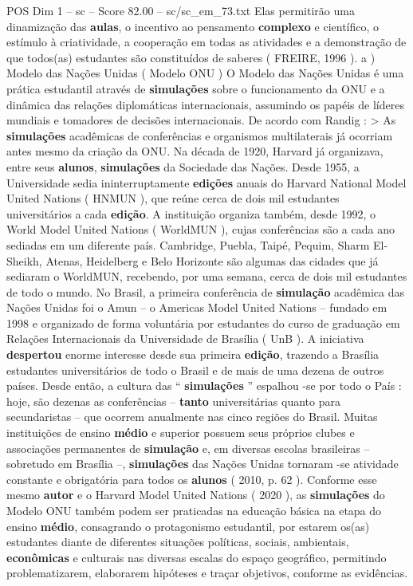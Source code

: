 \begin{textsample}{POS Dim 1 – sc – Score 82.00 – sc/sc\_em\_73.txt}
Elas permitirão uma dinamização das \textbf{aulas}, o incentivo ao pensamento \textbf{complexo} e científico, o estímulo à criatividade, a cooperação em todas as atividades e a demonstração de que todos(as) estudantes são constituídos de saberes ( FREIRE, 1996 ). a ) Modelo das Nações Unidas ( Modelo ONU ) O Modelo das Nações Unidas é uma prática estudantil através de \textbf{simulações} sobre o funcionamento da ONU e a dinâmica das relações diplomáticas internacionais, assumindo os papéis de líderes mundiais e tomadores de decisões internacionais.
De acordo com Randig : > As \textbf{simulações} acadêmicas de conferências e organismos multilaterais já ocorriam antes mesmo da criação da ONU.
Na década de 1920, Harvard já organizava, entre seus \textbf{alunos}, \textbf{simulações} da Sociedade das Nações.
Desde 1955, a Universidade sedia ininterruptamente \textbf{edições} anuais do Harvard National Model United Nations ( HNMUN ), que reúne cerca de dois mil estudantes universitários a cada \textbf{edição}.
A instituição organiza também, desde 1992, o World Model United Nations ( WorldMUN ), cujas conferências são a cada ano sediadas em um diferente país.
Cambridge, Puebla, Taipé, Pequim, Sharm El-Sheikh, Atenas, Heidelberg e Belo Horizonte são algumas das cidades que já sediaram o WorldMUN, recebendo, por uma semana, cerca de dois mil estudantes de todo o mundo.
No Brasil, a primeira conferência de \textbf{simulação} acadêmica das Nações Unidas foi o Amun – o Americas Model United Nations – fundado em 1998 e organizado de forma voluntária por estudantes do curso de graduação em Relações Internacionais da Universidade de Brasília ( UnB ).
A iniciativa \textbf{despertou} enorme interesse desde sua primeira \textbf{edição}, trazendo a Brasília estudantes universitários de todo o Brasil e de mais de uma dezena de outros países.
Desde então, a cultura das “ \textbf{simulações} ” espalhou -se por todo o País : hoje, são dezenas as conferências – \textbf{tanto} universitárias quanto para secundaristas – que ocorrem anualmente nas cinco regiões do Brasil.
Muitas instituições de ensino \textbf{médio} e superior possuem seus próprios clubes e associações permanentes de \textbf{simulação} e, em diversas escolas brasileiras – sobretudo em Brasília –, \textbf{simulações} das Nações Unidas tornaram -se atividade constante e obrigatória para todos os \textbf{alunos} ( 2010, p. 62 ).
Conforme esse mesmo \textbf{autor} e o Harvard Model United Nations ( 2020 ), as \textbf{simulações} do Modelo ONU também podem ser praticadas na educação básica na etapa do ensino \textbf{médio}, consagrando o protagonismo estudantil, por estarem os(as) estudantes diante de diferentes situações políticas, sociais, ambientais, \textbf{econômicas} e culturais nas diversas escalas do espaço geográfico, permitindo problematizarem, elaborarem hipóteses e traçar objetivos, conforme as evidências.

\end{textsample}
